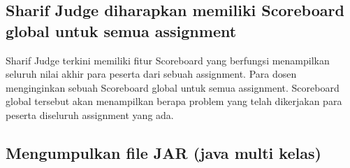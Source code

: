 \subsection{Sharif Judge diharapkan memiliki Scoreboard global untuk semua assignment}
Sharif Judge terkini memiliki fitur Scoreboard yang berfungsi menampilkan seluruh nilai akhir para peserta dari sebuah assignment. Para dosen menginginkan sebuah Scoreboard global untuk semua assignment. Scoreboard global tersebut akan menampilkan berapa problem yang telah dikerjakan para peserta diseluruh assignment yang ada.

\subsection{Mengumpulkan file JAR (java multi kelas)}

